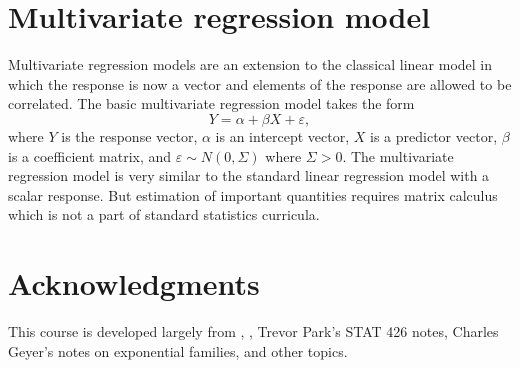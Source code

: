 \documentclass[12pt]{article}
\begin{document}
\section*{Multivariate regression model}

Multivariate regression models are an extension to the classical linear model in which the response is now a vector and elements of the response are allowed to be correlated. The basic multivariate regression model takes the form
$$
  Y = \alpha +\beta X  + \varepsilon,
$$
where $Y$ is the response vector, $\alpha$ is an intercept vector, $X$ is a predictor vector, $\beta$ is a coefficient matrix, and $\varepsilon \sim N(0, \Sigma)$ where  $\Sigma > 0$. The multivariate regression model is very similar to the standard linear regression model with a scalar response. But estimation of important quantities requires matrix calculus which is not a part of standard statistics curricula.




\section*{Acknowledgments}

This course is developed largely from \cite{agresti2013cat}, \cite{faraway2016extending}, Trevor Park’s STAT 426 notes, Charles Geyer’s notes on exponential families, and other topics. 




\end{document}
